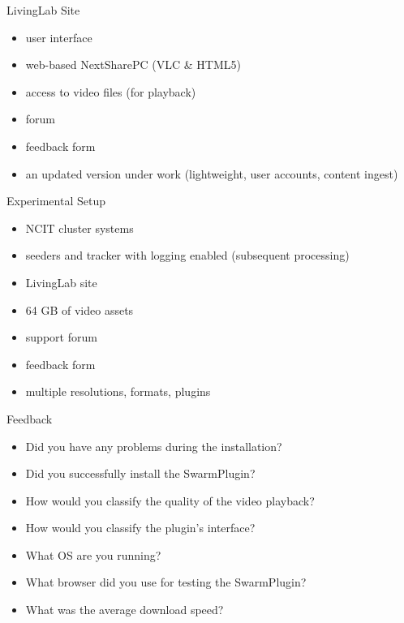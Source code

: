 \documentclass{beamer}
\begin{document}
\begin{frame}{LivingLab Site}
  \begin{itemize}
    \item user interface
    \item web-based NextSharePC (VLC \& HTML5)
    \item access to video files (for playback)
    \item forum
    \item feedback form
    \item an updated version under work (lightweight, user accounts, content
    ingest)
  \end{itemize}
\end{frame}

\begin{frame}{Experimental Setup}
  \begin{itemize}
    \item NCIT cluster systems
    \item seeders and tracker with logging enabled (subsequent processing)
    \item LivingLab site
    \item 64 GB of video assets
    \item support forum
    \item feedback form
    \item multiple resolutions, formats, plugins
  \end{itemize}
\end{frame}

\begin{frame}{Feedback}
  \begin{itemize}
    \item Did you have any problems during the installation?
    \item Did you successfully install the SwarmPlugin?
    \item How would you classify the quality of the video playback?
    \item How would you classify the plugin's interface?
    \item What OS are you running?
    \item What browser did you use for testing the SwarmPlugin?
    \item What was the average download speed?
  \end{itemize}
\end{frame}
\end{document}
